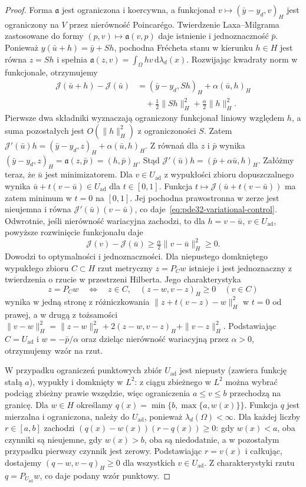 \begin{proof}
Forma $\mathfrak a$ jest ograniczona i koercywna,
a funkcjonał $v\mapsto(\bar y-y_d,v)_H$ jest
ograniczony na $V$ przez nierówność Poincarégo.
Twierdzenie Laxa--Milgrama zastosowane do formy
$(p,v)\mapsto\mathfrak a(v,p)$ daje istnienie
i jednoznaczność $\bar p$.
Ponieważ $y(\bar u+h)=\bar y+S h$, pochodna
Frécheta stanu w kierunku $h\in H$ jest równa
$z=S h$ i spełnia
$\mathfrak a(z,v)=\int_\Omega hv\,\mathrm d\lambda_d(x)$.
Rozwijając kwadraty norm w funkcjonale, otrzymujemy
\[
 \begin{aligned}
 \mathcal J(\bar u+h)-\mathcal J(\bar u)
 &= (\bar y-y_d,S h)_H+\alpha(\bar u,h)_H\\
 &\quad+\tfrac12\|S h\|_H^2+\tfrac\alpha2\|h\|_H^2.
 \end{aligned}
\]
Pierwsze dwa składniki wyznaczają ograniczony
funkcjonał liniowy względem $h$, a suma pozostałych
jest $O(\|h\|_H^2)$ z ograniczoności $S$.
Zatem $\mathcal J'(\bar u)h=(\bar y-y_d,z)_H+
\alpha(\bar u,h)_H$. Z równań dla $z$ i $\bar p$
wynika
$(\bar y-y_d,z)_H=\mathfrak a(z,\bar p)=
(h,\bar p)_H$. Stąd $\mathcal J'(\bar u)h=
(\bar p+\alpha\bar u,h)_H$.
Załóżmy teraz, że $\bar u$ jest minimizatorem.
Dla $v\in U_{\mathrm{ad}}$ z wypukłości zbioru
dopuszczalnego wynika
$\bar u+t(v-\bar u)\in U_{\mathrm{ad}}$ dla $t\in[0,1]$.
Funkcja $t\mapsto\mathcal J(\bar u+t(v-\bar u))$
ma zatem minimum w $t=0$ na $[0,1]$.
Jej pochodna prawostronna w zerze jest nieujemna
i równa $\mathcal J'(\bar u)(v-\bar u)$,
co daje~\eqref{eq:pde32-variational-control}.
Odwrotnie, jeśli nierówność wariacyjna zachodzi,
to dla $h=v-\bar u$, $v\in U_{\mathrm{ad}}$,
powyższe rozwinięcie funkcjonału daje
\[
 \mathcal J(v)-\mathcal J(\bar u)
 \ge\tfrac\alpha2\|v-\bar u\|_H^2\ge0.
\]
Dowodzi to optymalności i jednoznaczności.
Dla niepustego domkniętego wypukłego zbioru
$C\subset H$ rzut metryczny $z=P_Cw$ istnieje
i jest jednoznaczny z twierdzenia o rzucie
w przestrzeni Hilberta. Jego charakterystyka
\[
 z=P_Cw\quad\Longleftrightarrow\quad
 z\in C,\quad (z-w,v-z)_H\ge0\quad(v\in C)
\]
wynika w jedną stronę z różniczkowania
$\|z+t(v-z)-w\|_H^2$ w $t=0$ od prawej,
a w drugą z tożsamości
$\|v-w\|_H^2=\|z-w\|_H^2+
2(z-w,v-z)_H+\|v-z\|_H^2$.
Podstawiając $C=U_{\mathrm{ad}}$ i $w=-\bar p/\alpha$
oraz dzieląc nierówność wariacyjną przez
$\alpha>0$, otrzymujemy wzór na rzut.

W przypadku ograniczeń punktowych zbiór
$U_{\mathrm{ad}}$ jest niepusty (zawiera funkcję
stałą $a$), wypukły i domknięty w $L^2$:
z ciągu zbieżnego w $L^2$ można wybrać
podciąg zbieżny prawie wszędzie, więc ograniczenia
$a\le v\le b$ przechodzą na granicę.
Dla $w\in H$ określamy
$q(x)=\min\{b,\max\{a,w(x)\}\}$.
Funkcja $q$ jest mierzalna i ograniczona, należy
do $U_{\mathrm{ad}}$, ponieważ $\lambda_d(\Omega)<\infty$.
Dla każdej liczby $r\in[a,b]$ zachodzi
$(q(x)-w(x))(r-q(x))\ge0$: gdy $w(x)<a$,
oba czynniki są nieujemne, gdy $w(x)>b$,
oba są niedodatnie, a w pozostałym przypadku
pierwszy czynnik jest zerowy.
Podstawiając $r=v(x)$ i całkując, dostajemy
$(q-w,v-q)_H\ge0$ dla wszystkich $v\in U_{\mathrm{ad}}$.
Z charakterystyki rzutu $q=P_{U_{\mathrm{ad}}}w$,
co daje podany wzór punktowy.
\end{proof}

